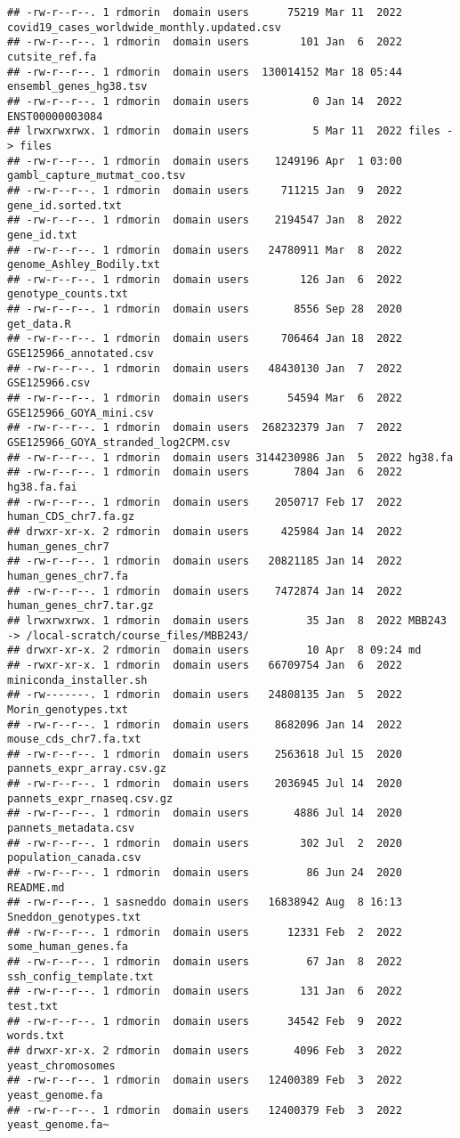 \documentclass[
]{article}
\begin{document}
\begin{verbatim}
## -rw-r--r--. 1 rdmorin  domain users      75219 Mar 11  2022 covid19_cases_worldwide_monthly.updated.csv
## -rw-r--r--. 1 rdmorin  domain users        101 Jan  6  2022 cutsite_ref.fa
## -rw-r--r--. 1 rdmorin  domain users  130014152 Mar 18 05:44 ensembl_genes_hg38.tsv
## -rw-r--r--. 1 rdmorin  domain users          0 Jan 14  2022 ENST00000003084
## lrwxrwxrwx. 1 rdmorin  domain users          5 Mar 11  2022 files -> files
## -rw-r--r--. 1 rdmorin  domain users    1249196 Apr  1 03:00 gambl_capture_mutmat_coo.tsv
## -rw-r--r--. 1 rdmorin  domain users     711215 Jan  9  2022 gene_id.sorted.txt
## -rw-r--r--. 1 rdmorin  domain users    2194547 Jan  8  2022 gene_id.txt
## -rw-r--r--. 1 rdmorin  domain users   24780911 Mar  8  2022 genome_Ashley_Bodily.txt
## -rw-r--r--. 1 rdmorin  domain users        126 Jan  6  2022 genotype_counts.txt
## -rw-r--r--. 1 rdmorin  domain users       8556 Sep 28  2020 get_data.R
## -rw-r--r--. 1 rdmorin  domain users     706464 Jan 18  2022 GSE125966_annotated.csv
## -rw-r--r--. 1 rdmorin  domain users   48430130 Jan  7  2022 GSE125966.csv
## -rw-r--r--. 1 rdmorin  domain users      54594 Mar  6  2022 GSE125966_GOYA_mini.csv
## -rw-r--r--. 1 rdmorin  domain users  268232379 Jan  7  2022 GSE125966_GOYA_stranded_log2CPM.csv
## -rw-r--r--. 1 rdmorin  domain users 3144230986 Jan  5  2022 hg38.fa
## -rw-r--r--. 1 rdmorin  domain users       7804 Jan  6  2022 hg38.fa.fai
## -rw-r--r--. 1 rdmorin  domain users    2050717 Feb 17  2022 human_CDS_chr7.fa.gz
## drwxr-xr-x. 2 rdmorin  domain users     425984 Jan 14  2022 human_genes_chr7
## -rw-r--r--. 1 rdmorin  domain users   20821185 Jan 14  2022 human_genes_chr7.fa
## -rw-r--r--. 1 rdmorin  domain users    7472874 Jan 14  2022 human_genes_chr7.tar.gz
## lrwxrwxrwx. 1 rdmorin  domain users         35 Jan  8  2022 MBB243 -> /local-scratch/course_files/MBB243/
## drwxr-xr-x. 2 rdmorin  domain users         10 Apr  8 09:24 md
## -rwxr-xr-x. 1 rdmorin  domain users   66709754 Jan  6  2022 miniconda_installer.sh
## -rw-------. 1 rdmorin  domain users   24808135 Jan  5  2022 Morin_genotypes.txt
## -rw-r--r--. 1 rdmorin  domain users    8682096 Jan 14  2022 mouse_cds_chr7.fa.txt
## -rw-r--r--. 1 rdmorin  domain users    2563618 Jul 15  2020 pannets_expr_array.csv.gz
## -rw-r--r--. 1 rdmorin  domain users    2036945 Jul 14  2020 pannets_expr_rnaseq.csv.gz
## -rw-r--r--. 1 rdmorin  domain users       4886 Jul 14  2020 pannets_metadata.csv
## -rw-r--r--. 1 rdmorin  domain users        302 Jul  2  2020 population_canada.csv
## -rw-r--r--. 1 rdmorin  domain users         86 Jun 24  2020 README.md
## -rw-r--r--. 1 sasneddo domain users   16838942 Aug  8 16:13 Sneddon_genotypes.txt
## -rw-r--r--. 1 rdmorin  domain users      12331 Feb  2  2022 some_human_genes.fa
## -rw-r--r--. 1 rdmorin  domain users         67 Jan  8  2022 ssh_config_template.txt
## -rw-r--r--. 1 rdmorin  domain users        131 Jan  6  2022 test.txt
## -rw-r--r--. 1 rdmorin  domain users      34542 Feb  9  2022 words.txt
## drwxr-xr-x. 2 rdmorin  domain users       4096 Feb  3  2022 yeast_chromosomes
## -rw-r--r--. 1 rdmorin  domain users   12400389 Feb  3  2022 yeast_genome.fa
## -rw-r--r--. 1 rdmorin  domain users   12400379 Feb  3  2022 yeast_genome.fa~
\end{verbatim}
\end{document}
